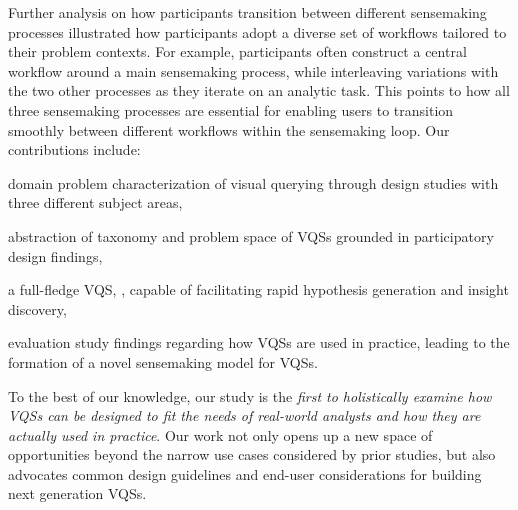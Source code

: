 \par Further analysis on how participants transition between different sensemaking processes illustrated how participants adopt a diverse set of workflows tailored to their problem contexts. For example, participants often construct a central workflow around a main sensemaking process, while interleaving variations with the two other processes as they iterate on an analytic task. This points to how all three sensemaking processes are essential for enabling users to transition smoothly between different workflows within the sensemaking loop. Our contributions include: 
\begin{denselist}
\item domain problem characterization of visual querying through design studies with three different subject areas,
\item abstraction of taxonomy and problem space of VQSs grounded in participatory design findings,
\item a full-fledge VQS, \zvpp, capable of facilitating rapid hypothesis generation and insight discovery,
\item evaluation study findings regarding how VQSs are used in practice, leading to the formation of a novel sensemaking model for VQSs. %
\end{denselist}
To the best of our knowledge, our study is the \emph{first to holistically examine how VQSs can be designed to fit the needs of real-world analysts and how they are actually used in practice}. Our work not only opens up a new space of opportunities beyond the narrow use cases considered by prior studies, but also advocates common design guidelines and end-user considerations for building next generation VQSs. %

